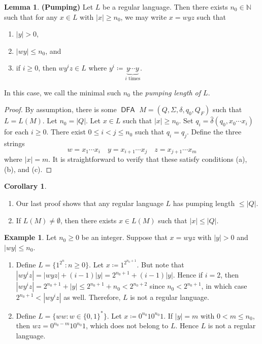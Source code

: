 \documentclass[10pt,letterpaper,cm]{nupset}
\theoremstyle{definition}
\newtheorem{exmp}{Example}
\newtheorem{corollary}{Corollary}
\newtheorem{lemma}{Lemma}
\newcommand{\N}{\mathbb N}
\newcommand{\1}{\mathbf{1}}
\newcommand{\0}{\vec 0}
\DeclareMathOperator{\DFA}{\mathsf{DFA}}
\begin{document}
\begin{lemma}{\textbf{(Pumping)}} Let $L$ be a regular language. Then there exists $n_0 \in \N$ such that for any $x\in L$ with $|x|\geq n_0$, we may write $x=wyz$ such that
\begin{enumerate}[label=(\alph*)]
\item $|y| >0$,
\item $|wy|\leq n_0$, and
\item if $i\geq 0$, then $wy^iz \in L$ where $y^i \coloneqq \underbrace{y\cdots y}_{i \text{ times}}$.
\end{enumerate}
In this case, we call the minimal such $n_0$ the \textit{pumping length of $L$}.
\end{lemma}
\begin{proof}
By assumption, there is some $\DFA$ $M = (Q, \Sigma, \delta, q_0, Q_F)$ such that $L = L(M)$. Let $n_0 = |Q|$. Let $x\in L$ such that $|x|\geq n_0$. Set $q_i = \hat{\delta}(q_0, x_0 \cdots x_i)$ for each $i\geq 0$.  There exist $0\leq i<j \leq n_0$ such that $q_i = q_j$. Define the three strings $$w= x_1\cdots x_i \quad  y= x_{i+1}\cdots x_j \quad z= x_{j+1} \cdots x_m$$ where $|x| = m$. It is straightforward to verify that these satisfy conditions (a), (b), and (c).
\end{proof}
\begin{corollary} $ $
\begin{enumerate} 
\item Our last proof shows that any regular language $L$ has pumping length $\leq |Q|$.
\item If $L(M) \ne \emptyset$, then there exists $x\in L(M)$ such that $|x| \leq |Q|$.
\end{enumerate}
\end{corollary}

\begin{exmp} Let $n_0\geq 0$ be an integer. Suppose that $x=wyz$ with $|y| >0$ and $|wy|\leq n_0$.
\begin{enumerate}
\item Define $L=  \{ 1^{2^n} : n\geq 0\}$. Let $x\coloneqq 1^{2^{n_0+1}}$.  But note that $|wy^iz| = |wyz| + (i-1)|y| = 2^{n_0+1} + (i-1)|y|$. Hence if $i=2$, then $|wy^i z| = 2^{n_0+1} +|y| \leq 2^{n_0+1} +n_0 < 2^{n_0+2}$ since $n_0 < 2^{n_0+1}$, in which case $2^{n_0+1} < |wy^iz|$ as well. Therefore, $L$ is not a regular language. 
\item Define $L = \{ ww : w \in \{0,1\}^{\ast}\}$. Let $x\coloneqq 0^{n_0}10^{n_0}1$. If $|y|= m$ with $0<m\leq n_0$,  then $wz= 0^{n_0-m}10^{n_0}1$, which does not belong to $L$. Hence $L$ is not a regular language. 
\end{enumerate}
\end{exmp}
\end{document}
